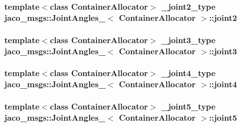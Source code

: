 \subsubsection[{\texorpdfstring{joint2}{joint2}}]{\setlength{\rightskip}{0pt plus 5cm}template$<$class Container\+Allocator$>$ {\bf \+\_\+joint2\+\_\+type} {\bf jaco\+\_\+msgs\+::\+Joint\+Angles\+\_\+}$<$ Container\+Allocator $>$\+::joint2}\hypertarget{structjaco__msgs_1_1JointAngles___ad7bfb312caeafc6b2cb1fc02c6a3e116}{}\label{structjaco__msgs_1_1JointAngles___ad7bfb312caeafc6b2cb1fc02c6a3e116}
\subsubsection[{\texorpdfstring{joint3}{joint3}}]{\setlength{\rightskip}{0pt plus 5cm}template$<$class Container\+Allocator$>$ {\bf \+\_\+joint3\+\_\+type} {\bf jaco\+\_\+msgs\+::\+Joint\+Angles\+\_\+}$<$ Container\+Allocator $>$\+::joint3}\hypertarget{structjaco__msgs_1_1JointAngles___ae8e5d407b34f0a6acd368ec1a28df526}{}\label{structjaco__msgs_1_1JointAngles___ae8e5d407b34f0a6acd368ec1a28df526}
\subsubsection[{\texorpdfstring{joint4}{joint4}}]{\setlength{\rightskip}{0pt plus 5cm}template$<$class Container\+Allocator$>$ {\bf \+\_\+joint4\+\_\+type} {\bf jaco\+\_\+msgs\+::\+Joint\+Angles\+\_\+}$<$ Container\+Allocator $>$\+::joint4}\hypertarget{structjaco__msgs_1_1JointAngles___accb31f45f3a313794a9cab57b8a9b952}{}\label{structjaco__msgs_1_1JointAngles___accb31f45f3a313794a9cab57b8a9b952}
\subsubsection[{\texorpdfstring{joint5}{joint5}}]{\setlength{\rightskip}{0pt plus 5cm}template$<$class Container\+Allocator$>$ {\bf \+\_\+joint5\+\_\+type} {\bf jaco\+\_\+msgs\+::\+Joint\+Angles\+\_\+}$<$ Container\+Allocator $>$\+::joint5}\hypertarget{structjaco__msgs_1_1JointAngles___ad02e456e0b382b2bf59b4eeb93318921}{}\label{structjaco__msgs_1_1JointAngles___ad02e456e0b382b2bf59b4eeb93318921}
